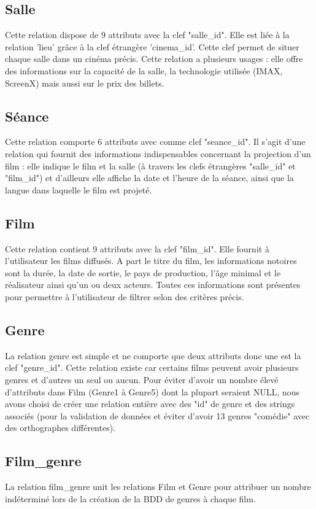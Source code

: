 \documentclass[12pt]{article}
\begin{document}
\subsection{Salle}
Cette relation dispose de 9 attributs avec la clef "salle{\_}id".
Elle est liée à la relation 'lieu' grâce à la clef étrangère 'cinema{\_}id'. Cette clef permet de situer chaque salle
dans un cinéma précis. Cette relation a plusieurs usages : elle offre des informations sur la capacité de la salle,
la technologie utilisée (IMAX, ScreenX) mais aussi sur le prix des billets.
\subsection{Séance}
Cette relation comporte 6 attributs avec comme clef "seance{\_}id". Il s'agit d'une relation qui fournit des informations
indispensables concernant la projection d'un film : elle indique le film et la salle (à travers les clefs étrangères "salle{\_}id"
et "film{\_}id") et d'ailleurs elle affiche la date et l'heure de la séance, ainsi que la langue dans laquelle le film est projeté.
\subsection{Film}
Cette relation contient 9 attributs avec la clef "film{\_}id". Elle fournit à l'utilisateur les films diffusés.
A part le titre du film, les informations notoires sont la durée, la date de sortie, le pays de production, l'âge minimal
et le réalisateur ainsi qu'un ou deux acteurs. Toutes ces informations sont présentes pour permettre à l'utilisateur de filtrer selon des critères précis.
\subsection{Genre}
La relation genre est simple et ne comporte que deux attributs donc une est la clef "genre{\_}id". 
Cette relation existe car certains films peuvent avoir plusieurs genres et d'autres un seul ou aucun. Pour éviter d'avoir 
un nombre élevé d'attributs dans Film (Genre1 à Genre5) dont la plupart seraient NULL, nous avons choisi de créer une 
relation entière avec des "id" de genre et des strings associés (pour la validation de données et éviter
d'avoir 13 genres "comédie" avec des orthographes différentes).
\subsection{Film{\_}genre}
La relation film{\_}genre unit les relations Film et Genre pour attribuer un nombre indéterminé lors de la création de la BDD de genres à chaque film.
\end{document}
